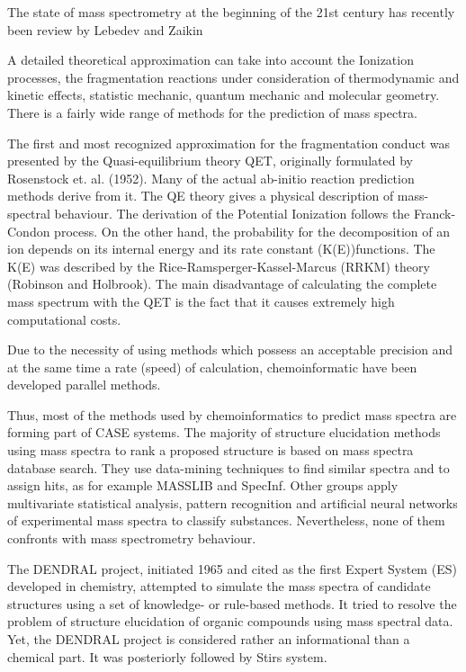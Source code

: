 \documentclass[10pt]{bmc_article}
\newenvironment{bmcformat}{\begin{raggedright}\baselineskip20pt\sloppy\setboolean{publ}{false}}{\end{raggedright}\baselineskip20pt\sloppy}
\begin{document}
\begin{bmcformat}
The state of mass spectrometry at the beginning of the 21st century has recently been 
review by Lebedev and Zaikin \cite{Lebedev:2008p2704}

A detailed theoretical approximation can take into account the Ionization 
processes, the fragmentation reactions under consideration of thermodynamic and 
kinetic effects, statistic mechanic, quantum mechanic and molecular geometry. 
There is a fairly wide range of methods for the prediction of mass spectra.
   
The first and most recognized approximation for the fragmentation conduct was 
presented by the Quasi-equilibrium theory QET, originally formulated by 
Rosenstock et. al. (1952)\cite{mcLafferty1980}. Many of the actual ab-initio 
reaction prediction methods derive from it. The QE theory gives a physical 
description of mass-spectral behaviour. The derivation of the Potential 
Ionization follows the Franck-Condon process. On the other hand, the 
probability for the decomposition of an ion depends on its internal energy and 
its rate constant (K(E))functions. The K(E) was described by the 
Rice-Ramsperger-Kassel-Marcus\cite{marcus1952} (RRKM) theory (Robinson and 
Holbrook\cite{robinson1972,frost1973}). The main disadvantage of calculating 
the complete mass spectrum with the QET is the fact that it causes extremely 
high computational costs.

Due to the necessity of using methods which possess an acceptable precision and 
at the same time a rate (speed) of calculation, chemoinformatic have been 
developed parallel methods.

Thus, most of the methods used by chemoinformatics to predict mass spectra are 
forming part of CASE systems. The majority of structure elucidation methods 
using mass spectra to rank a proposed structure is based on mass spectra 
database search. They use data-mining techniques to find similar spectra and to 
assign hits, as for example MASSLIB\cite{massLib1987,henneberg1988} and 
SpecInf\cite{specInfo2007,bremser1988}. Other groups apply multivariate statistical 
analysis\cite{lohninger1987}, pattern recognition\cite{kwok1973,jalali2000} and artificial 
neural networks \cite{curry1990} of experimental mass spectra to classify 
substances. Nevertheless, none of them confronts with mass spectrometry 
behaviour.

The DENDRAL\cite{dendral1980} project, initiated 1965 and cited as the first Expert 
System (ES) developed in chemistry, attempted to simulate the mass spectra of 
candidate structures using a set of knowledge- or rule-based methods. It tried 
to resolve the problem of structure elucidation of organic compounds using mass 
spectral data. Yet, the DENDRAL project is considered rather an informational 
than a chemical part. It was posteriorly followed by Stirs\cite{haraki1981} system.


\end{bmcformat}
\end{document}
